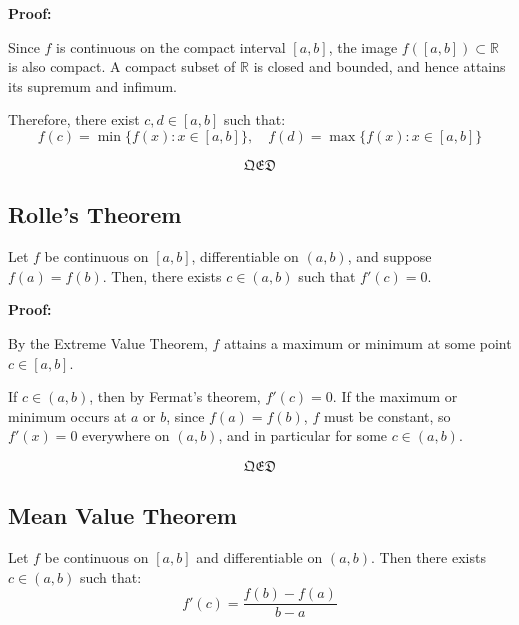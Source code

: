 \textbf{Proof:}  

Since \( f \) is continuous on the compact interval \([a, b]\), the image \( f([a, b]) \subset \mathbb{R} \) 
is also compact. A compact subset of \( \mathbb{R} \) is closed and bounded, and hence 
attains its supremum and infimum.

Therefore, there exist \( c, d \in [a, b] \) such that:
\[
f(c) = \min\{f(x): x \in [a, b]\}, \quad
f(d) = \max\{f(x): x \in [a, b]\}
\]

\[\mathfrak{QED}\]


\subsection{Rolle’s Theorem}

Let \( f \) be continuous on \([a, b] \), differentiable on \((a, b) \), and suppose \( f(a) = f(b) \).  
Then, there exists \( c \in (a, b) \) such that \( f'(c) = 0 \).

\textbf{Proof:}  

By the Extreme Value Theorem, \( f \) attains a maximum or minimum at some point \( c \in [a, b] \).

If \( c \in (a, b) \), then by Fermat’s theorem, \( f'(c) = 0 \).  
If the maximum or minimum occurs at \( a \) or \( b \), since \( f(a) = f(b) \), \( f \) must be constant, so \( f'(x) = 0 \) everywhere on \((a, b)\), and in particular for some \( c \in (a, b) \).

\[\mathfrak{QED}\]

\begin{center}
\end{center}



\subsection{Mean Value Theorem}

Let \( f \) be continuous on \([a, b] \) and differentiable on \((a, b) \).  
Then there exists \( c \in (a, b) \) such that:
\[
f'(c) = \frac{f(b) - f(a)}{b - a}
\]

